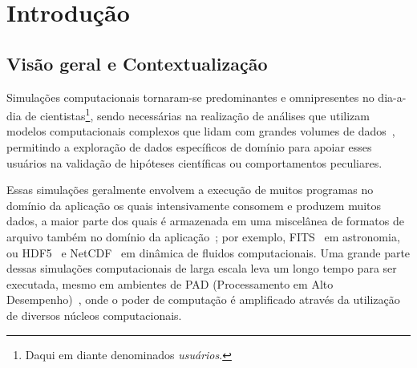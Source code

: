 
\chapter{Introdução}

\section{Visão geral e Contextualização}

Simulações computacionais tornaram-se predominantes e omnipresentes no dia-a-dia de cientistas\footnote{Daqui em diante denominados \textit{usuários}.}, sendo necessárias na realização de análises que utilizam modelos computacionais complexos que lidam com grandes volumes de dados~\cite{silva2015analyzing}, permitindo a exploração de dados específicos de domínio para apoiar esses usuários na validação de hipóteses científicas ou comportamentos peculiares.

Essas simulações geralmente envolvem a execução de muitos programas no domínio da aplicação os quais intensivamente consomem e produzem muitos dados, a maior parte dos quais é armazenada em uma miscelânea de formatos de arquivo também no domínio da aplicação~\cite{silva2015analyzing}; por exemplo,  FITS~\cite{greisen2002representations} em astronomia, ou  HDF5~\cite{hdfgroup2014hdf5} e  NetCDF~\cite{rew1990netcdf} em dinâmica de fluidos computacionais.
Uma grande parte dessas simulações computacionais de larga escala leva um longo tempo para ser executada, mesmo em ambientes de  PAD (Processamento em Alto Desempenho)~\cite{silva2017raw}, onde o poder de computação é amplificado através da utilização de diversos núcleos computacionais.


